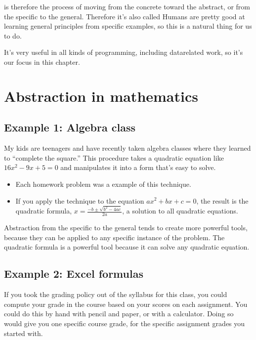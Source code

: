 \documentclass[letterpaper,10pt,english]{jupyterBook}
\begin{document}
\sphinxAtStartPar
{} is therefore the process of moving from the concrete toward the abstract, or from the specific to the general.  Therefore it’s also called   Humans are pretty good at learning general principles from specific examples, so this is a natural thing for us to do.

\sphinxAtStartPar
It’s very useful in all kinds of programming, including data\sphinxhyphen{}related work, so it’s our focus in this chapter.


\section{Abstraction in mathematics}
\label{\detokenize{chapter-7-abstraction:abstraction-in-mathematics}}

\subsection{Example 1: Algebra class}
\label{\detokenize{chapter-7-abstraction:example-1-algebra-class}}
\sphinxAtStartPar
My kids are teenagers and have recently taken algebra classes where they learned to “complete the square.”  This procedure takes a quadratic equation like \(16x^2-9x+5=0\) and manipulates it into a form that’s easy to solve.
\begin{itemize}
\item {} 
\sphinxAtStartPar
Each homework problem was a  example of this technique.

\item {} 
\sphinxAtStartPar
If you apply the technique to the equation \(ax^2+bx+c=0\), the result is the quadratic formula, \(x=\frac{-b\pm\sqrt{b^2-4ac}}{2a}\), a  solution to all quadratic equations.

\end{itemize}

\sphinxAtStartPar
Abstraction from the specific to the general tends to create more powerful tools, because they can be applied to any specific instance of the problem.  The quadratic formula is a powerful tool because it can solve any quadratic equation.


\subsection{Example 2: Excel formulas}
\label{\detokenize{chapter-7-abstraction:example-2-excel-formulas}}
\sphinxAtStartPar
If you took the grading policy out of the syllabus for this class, you could compute your grade in the course based on your scores on each assignment.  You could do this by hand with pencil and paper, or with a calculator.  Doing so would give you one specific course grade, for the specific assignment grades you started with.
\end{document}
